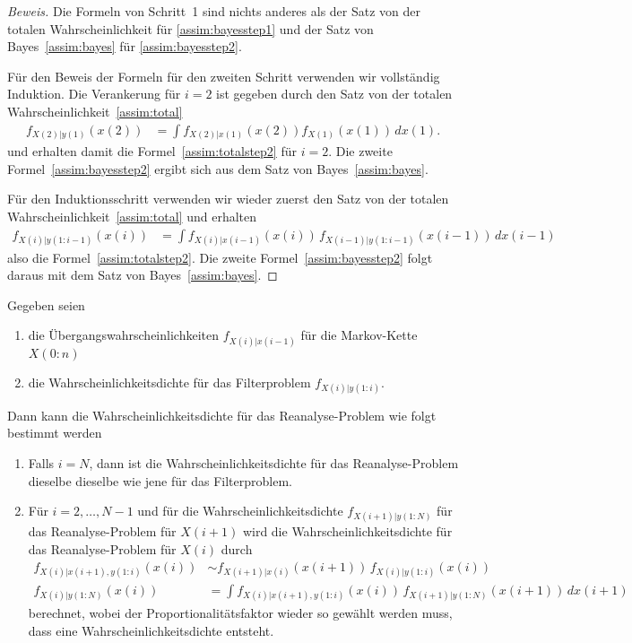 \begin{proof}[Beweis]
Die Formeln von Schritt~1 sind nichts anderes als der Satz von
der totalen Wahrscheinlichkeit für \eqref{assim:bayesstep1} und
der Satz von Bayes~\eqref{assim:bayes} für \eqref{assim:bayesstep2}.

Für den Beweis der Formeln für den zweiten Schritt verwenden wir 
vollständig Induktion.
Die Verankerung für $i=2$ ist gegeben durch den Satz von der totalen
Wahrscheinlichkeit~\eqref{assim:total}
\begin{align*}
f_{X(2)|y(1)}(x(2))
&=
\int f_{X(2)|x(1)}(x(2))  f_{X(1)}(x(1))\, dx(1).
\end{align*}
und erhalten damit die Formel~\eqref{assim:totalstep2} für $i=2$.
Die zweite Formel~\eqref{assim:bayesstep2} ergibt sich aus dem Satz
von Bayes~\eqref{assim:bayes}.

Für den Induktionsschritt verwenden wir wieder zuerst den Satz von der
totalen Wahrscheinlichkeit~\eqref{assim:total} und erhalten
\begin{align*}
f_{X(i)|y(1:i-1)}(x(i))
&=
\int f_{X(i)|x(i-1)}(x(i)) \, f_{X(i-1)|y(1:i-1)}(x(i-1))\,dx(i-1)
\end{align*}
also die Formel~\eqref{assim:totalstep2}.
Die zweite Formel~\eqref{assim:bayesstep2} folgt daraus mit dem Satz
von Bayes~\eqref{assim:bayes}.
\end{proof}


\begin{satz}[Reanalyse]
\label{satz:reanalyse}
Gegeben seien
\begin{enumerate}
\item
die Übergangswahrscheinlichkeiten $f_{X(i)|x(i-1)}$ für die
Markov-Kette $X(0:n)$
\item
die Wahrscheinlichkeitsdichte für das Filterproblem
$f_{X(i)|y(1:i)}$.
\end{enumerate}
Dann kann die Wahrscheinlichkeitsdichte für das Reanalyse-Problem wie folgt
bestimmt werden
\begin{enumerate}
\item Falls $i=N$, dann ist die Wahrscheinlichkeitsdichte für das
Reanalyse-Problem dieselbe dieselbe wie jene für das Filterproblem.
\item Für $i=2,\dots,N-1$ und für die Wahrscheinlichkeitsdichte 
$f_{X(i+1)|y(1:N)}$  für das Reanalyse-Problem für $X(i+1)$ 
wird die Wahrscheinlichkeitsdichte für das Reanalyse-Problem für $X(i)$
durch
\begin{align}
f_{X(i)|x(i+1),y(1:i)}(x(i))
&\sim
f_{X(i+1)|x(i)}(x(i+1))\, f_{X(i)|y(1:i)}(x(i))
\label{assim:reanabayes}
\\
f_{X(i)|y(1:N)}(x(i))
&=
\int f_{X(i)|x(i+1),y(1:i)}(x(i))\, f_{X(i+1)|y(1:N)}(x(i+1))\,dx(i+1)
\label{assim:reanatotal}
\end{align}
berechnet,
wobei der Proportionalitätsfaktor wieder so gewählt werden muss, dass
eine Wahrscheinlichkeitsdichte entsteht.
\end{enumerate}
\end{satz}

